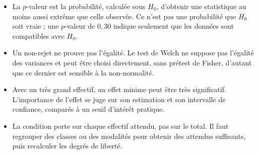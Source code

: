 {\begin{enumerate}
{\begin{itemize}
\item[b)] La $p$-valeur est la probabilité, calculée sous $H_0$, d'obtenir une statistique au moins aussi extrême que celle observée. Ce n'est pas une probabilité que $H_0$ soit vraie ; une $p$-valeur de $0{,}30$ indique seulement que les données sont compatibles avec $H_0$.
\item[c)] Un non-rejet ne prouve pas l'égalité. Le test de Welch ne suppose pas l'égalité des variances et peut être choisi directement, sans prétest de Fisher, d'autant que ce dernier est sensible à la non-normalité.
\item[d)] Avec un très grand effectif, un effet minime peut être très significatif. L'importance de l'effet se juge sur son estimation et son intervalle de confiance, comparés à un seuil d'intérêt pratique.
\item[e)] La condition porte sur chaque effectif attendu, pas sur le total. Il faut regrouper des classes ou des modalités pour obtenir des attendus suffisants, puis recalculer les degrés de liberté.
\end{itemize}
}
\end{enumerate}
}
